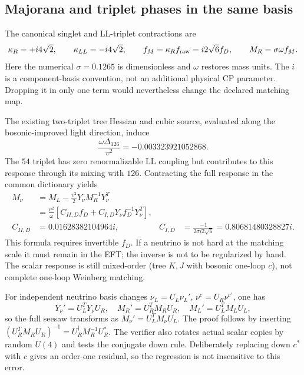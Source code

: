 \documentclass[11pt]{article}
\begin{document}
\subsection{Majorana and triplet phases in the same basis}
The canonical singlet and LL-triplet contractions are
\begin{equation}
 \kappa_R=+i4\sqrt2,\qquad \kappa_{LL}=-i4\sqrt2,\qquad
 f_M=\kappa_R f_{\rm raw}=i2\sqrt6 f_D,
 \qquad M_R=\sigma\omega f_M.
\end{equation}
Here the numerical $\sigma=0.1265$ is dimensionless and $\omega$ restores
mass units. The $i$ is a component-basis convention, not an additional
physical CP parameter. Dropping it in only one term would nevertheless
change the declared matching map.

The existing two-triplet tree Hessian and cubic source, evaluated along the
bosonic-improved light direction, induce
\begin{equation}
 \frac{\omega\Delta_{126}}{v^2}=-0.003323921052868.
\end{equation}
The $54$ triplet has zero renormalizable LL coupling but contributes to this
response through its mixing with $126$. Contracting the full response in
the common dictionary yields
\begin{align}
 M_\nu&=M_L-\frac{v^2}{2}Y_\nu M_R^{-1}Y_\nu^T\\
 &=\frac{v^2}{\omega}
 \left[C_{II,D}f_D+C_{I,D}Y_\nu f_D^{-1}Y_\nu^T\right],\\
 C_{II,D}&=0.01628382104964i,&
 C_{I,D}&=\frac{-1}{2\sigma i2\sqrt6}=0.80681480328827i.
\end{align}
This formula requires invertible $f_D$. If a neutrino is not hard at the
matching scale it must remain in the EFT; the inverse is not to be
regularized by hand. The scalar response is still mixed-order
(tree $K,J$ with bosonic one-loop $c$), not complete one-loop Weinberg
matching.

For independent neutrino basis changes $\nu_L=U_L\nu_L'$,
$\nu^c=U_R\nu^{c\prime}$, one has
\begin{equation}
Y_\nu'=U_L^TY_\nu U_R,\quad M_R'=U_R^TM_RU_R,\quad
M_L'=U_L^TM_LU_L,
\end{equation}
so the full seesaw transforms as $M_\nu'=U_L^TM_\nu U_L$.
The proof follows by inserting
$(U_R^TM_RU_R)^{-1}=U_R^\dagger M_R^{-1}U_R^*$.
The verifier also rotates actual scalar copies by random $U(4)$ and tests
the conjugate down rule. Deliberately replacing down $c^*$ with $c$ gives
an order-one residual, so the regression is not insensitive to this error.
\end{document}
